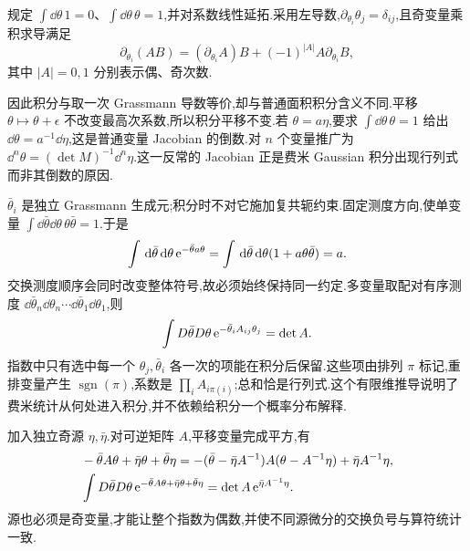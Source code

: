\begin{definition}[Berezin 积分]
规定 $\int\dd\theta\,1=0$、$\int\dd\theta\,\theta=1$,并对系数线性延拓.采用左导数,$\partial_{\theta_i}\theta_j=\delta_{ij}$,且奇变量乘积求导满足
\begin{equation}
 \partial_{\theta_i}(AB)=(\partial_{\theta_i}A)B+(-1)^{|A|}A\partial_{\theta_i}B,
\end{equation}
其中 $|A|=0,1$ 分别表示偶、奇次数.
\end{definition}

因此积分与取一次 Grassmann 导数等价,却与普通面积积分含义不同.平移 $\theta\mapsto\theta+\epsilon$ 不改变最高次系数,所以积分平移不变.若 $\theta=a\eta$,要求 $\int\dd\theta\,\theta=1$ 给出 $\dd\theta=a^{-1}\dd\eta$,这是普通变量 Jacobian 的倒数.对 $n$ 个变量推广为 $\dd^n\theta=(\det M)^{-1}\dd^n\eta$.这一反常的 Jacobian 正是费米 Gaussian 积分出现行列式而非其倒数的原因.

$\bar\theta_i$ 是独立 Grassmann 生成元;积分时不对它施加复共轭约束.固定测度方向,使单变量 $\int\dd\bar\theta\dd\theta\,\theta\bar\theta=1$.于是
\begin{equation}
 \int\,\mathrm d\bar\theta\,\mathrm d\theta\,\mathrm e^{-\bar\theta a\theta}
 =\int\,\mathrm d\bar\theta\,\mathrm d\theta(1+a\theta\bar\theta)=a.
\end{equation}
交换测度顺序会同时改变整体符号,故必须始终保持同一约定.多变量取配对有序测度 $\dd\bar\theta_n\dd\theta_n\cdots\dd\bar\theta_1\dd\theta_1$,则
\begin{equation}
 \int D\bar\theta D\theta\,\mathrm e^{-\bar\theta_i A_{ij}\theta_j}=\det A.
 \label{eq:grassmann-gaussian}
\end{equation}
指数中只有选中每一个 $\theta_j,\bar\theta_i$ 各一次的项能在积分后保留.这些项由排列 $\pi$ 标记,重排变量产生 $\operatorname{sgn}(\pi)$,系数是 $\prod_i A_{i\pi(i)}$;总和恰是行列式.这个有限维推导说明了费米统计从何处进入积分,并不依赖给积分一个概率分布解释.


加入独立奇源 $\eta,\bar\eta$.对可逆矩阵 $A$,平移变量完成平方,有
\begin{align}
 &-\bar\theta A\theta+\bar\eta\theta+\bar\theta\eta
 =-(\bar\theta-\bar\eta A^{-1})A(\theta-A^{-1}\eta)
   +\bar\eta A^{-1}\eta,\\
 &\int D\bar\theta D\theta\,
 \mathrm e^{-\bar\theta A\theta+\bar\eta\theta+\bar\theta\eta}
 =\det A\,\mathrm e^{\bar\eta A^{-1}\eta}.
\end{align}
源也必须是奇变量,才能让整个指数为偶数,并使不同源微分的交换负号与算符统计一致.

